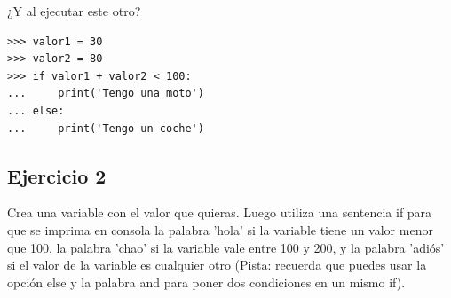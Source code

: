 ¿Y al ejecutar este otro?

\begin{listing}
\begin{verbatim}
>>> valor1 = 30
>>> valor2 = 80
>>> if valor1 + valor2 < 100:
...     print('Tengo una moto')
... else:
...     print('Tengo un coche')
\end{verbatim}
\end{listing}

\subsection*{Ejercicio 2}
Crea una variable con el valor que quieras. Luego utiliza una sentencia if para que se imprima en consola la palabra 'hola' si la variable tiene un valor menor que 100, la palabra 'chao' si la variable vale entre 100 y 200, y la palabra 'adiós' si el valor de la variable es cualquier otro (Pista: recuerda que puedes usar la opción else y la palabra and para poner dos condiciones en un mismo if).

\newpage
